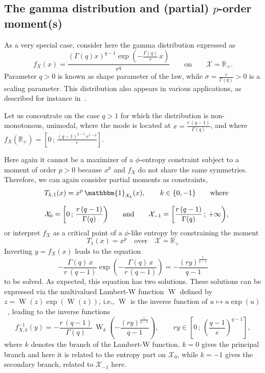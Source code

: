 \documentclass[entropy,article,submit,moreauthors,pdftex]{Definitions/mdpi}
\def\Rset{\mathbb{R}}%
\def\X{\mathcal{X}}%
\def\un{\mathbbm{1}}%
\def\W{\operatorname{W}} %
\begin{document}
  


\subsection{The gamma distribution and (partial) $p$-order moment(s)}
\label{subsecapp:GammaFirstOrder}

As a very special case, consider here the gamma distribution expressed as
%
\[
f_X(x) = \frac{\left( \Gamma(q)  x \right)^{q-1} \exp\left(- \frac{\Gamma(q)}{r}
  \, x \right)}{r^q} \qquad \mbox{on} \qquad \X = \Rset_+.
\]
%
Parameter  $q >  0$ is  known as  shape parameter  of the  law, while  $\sigma =
\frac{r}{\Gamma(q)} > 0$ is a  scaling parameter. This distribution also appears
in various applications, as described for instance in~\cite{JohKot95:v1}.

Let  us  concentrate  on  the  case  $q >  1$  for  which  the  distribution  is
non-monotonous,  unimodal,  where  the  mode  is located  at  $x  =  \frac{r  \,
  (q-1)}{\Gamma(q)}$,   and   where  $f_X(\Rset_+)   =   \left[   0  \,   ;   \,
  \frac{(q-1)^{q-1} \, e^{1-q}}{r} \right]$.

Here again it cannot be a maximizer  of a $\phi$-entropy constraint subject to a
moment  of  order $p  >  0$  because  $x^p$ and  $f_X$  do  not share  the  same
symmetries. Therefore, we can again consider partial moments as constraints,
%
\begin{eqnarray*}
  && T_{k,1}(x) = x^p \, \un_{\X_k}(x), \qquad k \in \{ 0 , -1 \} \qquad
  \mbox{where}
  \\[2.5mm]
  && \X_0 = \left[ 0 \, ; \, \frac{r \, (q-1)}{\Gamma(q)} \right) \qquad
    \mbox{and} \qquad \X_{-1} = \left[ \frac{r \, (q-1)}{\Gamma(q)} \, ; \:
      +\infty \right),
\end{eqnarray*}
%
or interpret $f_X$ as a critical  point of a $\phi$-like entropy by constraining
the moment
%
\[
T_1(x) = x^p \quad \mbox{over} \quad \X = \Rset_+
\]
%
Inverting $y = f_X(x)$ leads to the equation
%
\[
- \frac{\Gamma(q) \, x}{r \, (q-1)}  \exp\left( -  \frac{\Gamma(q) \, x}{r \, (q-1)}  \right) =  -
       \frac{\left( r y \right)^{\frac{1}{q-1}}}{q-1}
\]
%
to be solved. As expected, this  equation has two solutions. These solutions can
be expressed via  the multivalued Lambert-W function $\W$ defined  by $z = \W(z)
\exp(\W(z))$,   i.e.,  $\W$   is  the   inverse   function  of   $u  \mapsto   u
\exp(u)$~\cite[\S~1]{CorGon96}, leading to the inverse functions
%
\[
f_{X,k}^{-1}(y) = - \frac{r \,  (q-1)}{\Gamma(q)} \, \W_k\left( - \frac{\left( r
  y \right)^{\frac{1}{q-1}}}{q-1}  \right) ,  \qquad r  y \in \left[  0 \,  ; \,
  \left( \frac{q-1}{e} \right)^{q-1} \right],
\]
%
where  $k$  denotes the  branch  of  the  Lambert-W  function. $k=0$  gives  the
principal branch and here it is related  to the entropy part on $\X_0$, while $k
= -1$ gives the secondary branch, related to $\X_{-1}$ here.
\end{document}
